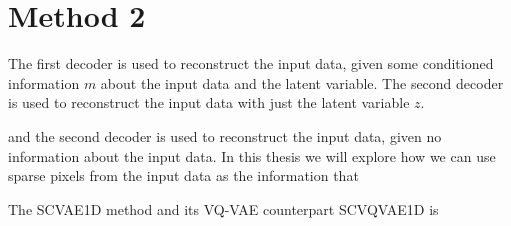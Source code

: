 \section{Method 2}


The first decoder is used to reconstruct the input data, given some conditioned information $m$ about the input data and the latent variable. The second decoder is used to reconstruct the input data with just the latent variable $z$.

and the second decoder is used to reconstruct the input data, given no information about the input data. In this thesis we will explore how we can use sparse pixels from the input data as the information that 

The SCVAE1D method and its VQ-VAE counterpart SCVQVAE1D is 





